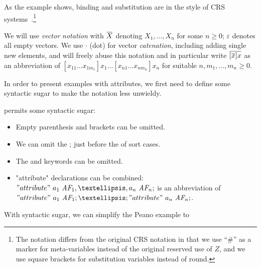 \documentclass[letterpaper,11pt]{article}
\begin{document}
As the example shows, binding and substitution are in the style of CRS
systems~\cite{Klop+:tcs1993}.\footnote{The notation differs from the original CRS notation in that
  we use ``\#'' as a marker for meta-variables instead of the original reserved use of $Z$, and we
  use square brackets for substitution variables instead of round.}

\begin{notation}
  We will use \emph{vector notation} with $\ov{X}$ denoting $X_1,…,X_n$ for some $n≥0$; $ε$ denotes
  all empty vectors. We use $·$ (dot) for vector \emph{catenation}, including adding single new
  elements, and will freely abuse this notation and in particular write $\ov{[\ov{x}]x}$ as an
  abbreviation of $[x_{11}…x_{1m_1}]x_1…[x_{n1}…x_{nm_n}]x_n$ for suitable $n,m_1,…,m_n ≥ 0$.
\end{notation}

In order to present examples with attributes, we first need to define some syntactic sugar to make
the notation less unwieldy.

\begin{notation}
  \HAX permits some syntactic sugar:
  \begin{itemize}

  \item Empty parenthesis and brackets can be omitted.

  \item We can omit the \kw; just before the \kw{\texttt{|}} of sort cases.

  \item The  and  keywords can be omitted.

  \item "attribute" declarations can be combined: $"attribute"~a_1~\set{AF}_1,…, a_n~\set{AF}_n ;$
    is an abbreviation of $"attribute"~a_1~\set{AF}_1;…; "attribute"~a_n~\set{AF}_n;$.

  \end{itemize}
\end{notation}

\begin{example}
  With syntactic sugar, we can simplify the Peano example to
\end{example}
\end{document}
